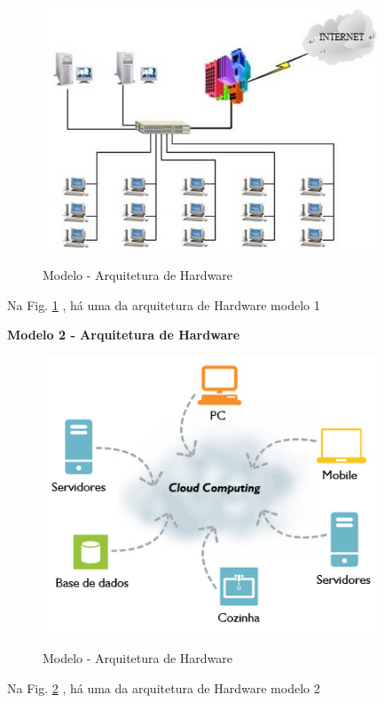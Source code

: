        \begin{figure}[H]
                 \caption{Modelo - Arquitetura de Hardware}
               \centering %
                \includegraphics[width=10cm]{analisedeProjeto/arquiteturaDeHardware} %
                \label{figura:arquiteturaDeHardware}
                \end{figure}
                Na Fig. \ref{figura:arquiteturaDeHardware} , há uma da arquitetura de Hardware modelo 1
                
                
                     \textbf{Modelo 2 - Arquitetura de Hardware }  
                
                
                  \begin{figure}[H]
                 \caption{Modelo - Arquitetura de Hardware}
               \centering %
                \includegraphics[width=10cm]{analisedeProjeto/arcloud} %
                \label{figura:arcloud}
                \end{figure}
                Na Fig. \ref{figura:arcloud} , há uma da arquitetura de Hardware modelo 2
                
